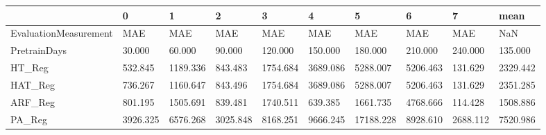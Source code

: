 \begin{tabular}{llllllllll}
\toprule
{} &        0 &        1 &        2 &        3 &        4 &         5 &        6 &        7 &     mean \\
\midrule
EvaluationMeasurement &      MAE &      MAE &      MAE &      MAE &      MAE &       MAE &      MAE &      MAE &      NaN \\
PretrainDays          &   30.000 &   60.000 &   90.000 &  120.000 &  150.000 &   180.000 &  210.000 &  240.000 &  135.000 \\
HT\_Reg                &  532.845 & 1189.336 &  843.483 & 1754.684 & 3689.086 &  5288.007 & 5206.463 &  131.629 & 2329.442 \\
HAT\_Reg               &  736.267 & 1160.647 &  843.496 & 1754.684 & 3689.086 &  5288.007 & 5206.463 &  131.629 & 2351.285 \\
ARF\_Reg               &  801.195 & 1505.691 &  839.481 & 1740.511 &  639.385 &  1661.735 & 4768.666 &  114.428 & 1508.886 \\
PA\_Reg                & 3926.325 & 6576.268 & 3025.848 & 8168.251 & 9666.245 & 17188.228 & 8928.610 & 2688.112 & 7520.986 \\
\bottomrule
\end{tabular}
